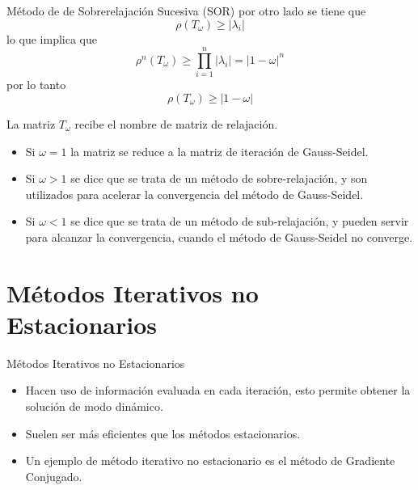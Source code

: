 \documentclass[10pt]{beamer}
\begin{document}
\begin{frame}{M\'etodo de de Sobrerelajaci\'on Sucesiva (SOR)}
por otro lado se tiene que
$$
\rho(T_{\omega}) \geq |\lambda_i|
$$
lo que implica que
$$
\rho^n(T_{\omega}) \geq \prod_{i=1}^n|\lambda_i|=|1-\omega|^n
$$
por lo tanto
$$
\rho(T_{\omega}) \geq |1-\omega|
$$
\end{frame}  
\frame
{
La matriz $T_{\omega}$ recibe el nombre de matriz de relajaci\'on.
\begin{itemize}
 \item<2-> Si $\omega = 1$ la matriz se reduce a la matriz de iteraci\'on de Gauss-Seidel.
 \item<3-> Si $\omega > 1$ se dice que se trata de un m\'etodo de sobre-relajaci\'on, y son utilizados para acelerar la convergencia del m\'etodo de Gauss-Seidel.
 \item<4-> Si $\omega <1$ se dice que se trata de un m\'etodo de sub-relajaci\'on, y pueden servir para alcanzar la convergencia, cuando el m\'etodo de Gauss-Seidel no converge.
\end{itemize}
}
\section{M\'etodos Iterativos no Estacionarios}
\begin{frame}{M\'etodos Iterativos no Estacionarios}
\begin{itemize} 
  \item<1-> Hacen uso de informaci\'on evaluada en cada iteraci\'on, esto permite obtener la soluci\'on de modo din\'amico.
 \item<2-> Suelen ser m\'as eficientes que los m\'etodos estacionarios.
 \item<3-> Un ejemplo de m\'etodo iterativo no estacionario es el m\'etodo de Gradiente Conjugado.
\end{itemize}
\end{frame}
\end{document}
